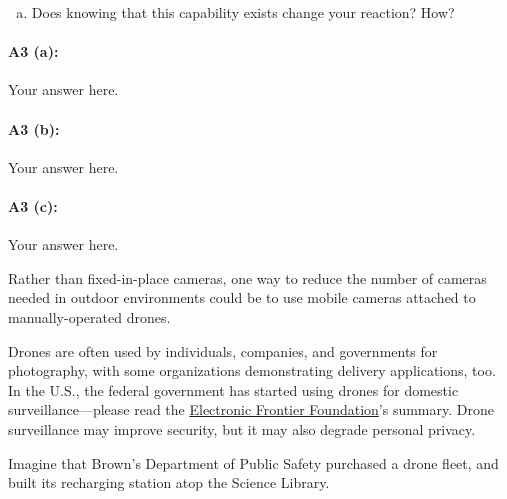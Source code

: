 \begin{enumerate}[(c)]
    \item Does knowing that this capability exists change your reaction? How?
\end{enumerate}

\paragraph{A3 (a):} Your answer here.



\paragraph{A3 (b):} Your answer here.



\paragraph{A3 (c):} Your answer here.


\newpage
Rather than fixed-in-place cameras, one way to reduce the number of cameras needed in outdoor environments could be to use mobile cameras attached to manually-operated drones. 

Drones are often used by individuals, companies, and governments for photography, with some organizations demonstrating delivery applications, too. In the U.S., the federal government has started using drones for domestic surveillance---please read the \href{https://www.eff.org/issues/surveillance-drones}{Electronic Frontier Foundation}'s summary. Drone surveillance may improve security, but it may also degrade personal privacy.


Imagine that Brown's Department of Public Safety purchased a drone fleet, and built its recharging station atop the Science Library. 

